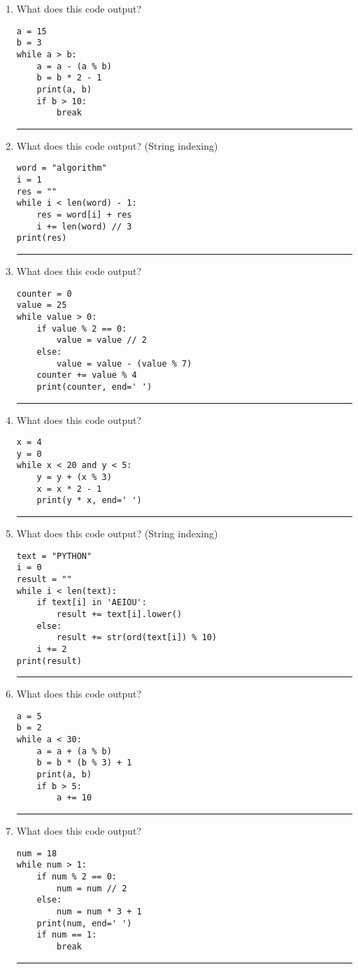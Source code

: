 \documentclass{article}
\begin{document}
\begin{enumerate}
    \item What does this code output?
    \begin{lstlisting}
a = 15
b = 3
while a > b:
    a = a - (a % b)
    b = b * 2 - 1
    print(a, b)
    if b > 10:
        break
    \end{lstlisting}
    \rule{\linewidth}{0.4pt}
    
    \item What does this code output? (String indexing)
    \begin{lstlisting}
word = "algorithm"
i = 1
res = ""
while i < len(word) - 1:
    res = word[i] + res
    i += len(word) // 3
print(res)
    \end{lstlisting}
    \rule{\linewidth}{0.4pt}
    
    \item What does this code output?
    \begin{lstlisting}
counter = 0
value = 25
while value > 0:
    if value % 2 == 0:
        value = value // 2
    else:
        value = value - (value % 7)
    counter += value % 4
    print(counter, end=' ')
    \end{lstlisting}
    \rule{\linewidth}{0.4pt}
    
    \item What does this code output?
    \begin{lstlisting}
x = 4
y = 0
while x < 20 and y < 5:
    y = y + (x % 3)
    x = x * 2 - 1
    print(y * x, end=' ')
    \end{lstlisting}
    \rule{\linewidth}{0.4pt}
    
    \item What does this code output? (String indexing)
    \begin{lstlisting}
text = "PYTHON"
i = 0
result = ""
while i < len(text):
    if text[i] in 'AEIOU':
        result += text[i].lower()
    else:
        result += str(ord(text[i]) % 10)
    i += 2
print(result)
    \end{lstlisting}
    \rule{\linewidth}{0.4pt}
    
    \item What does this code output?
    \begin{lstlisting}
a = 5
b = 2
while a < 30:
    a = a + (a % b)
    b = b * (b % 3) + 1
    print(a, b)
    if b > 5:
        a += 10
    \end{lstlisting}
    \rule{\linewidth}{0.4pt}
    
    \item What does this code output?
    \begin{lstlisting}
num = 18
while num > 1:
    if num % 2 == 0:
        num = num // 2
    else:
        num = num * 3 + 1
    print(num, end=' ')
    if num == 1:
        break
    \end{lstlisting}
    \rule{\linewidth}{0.4pt}
    

\end{enumerate}
\end{document}
